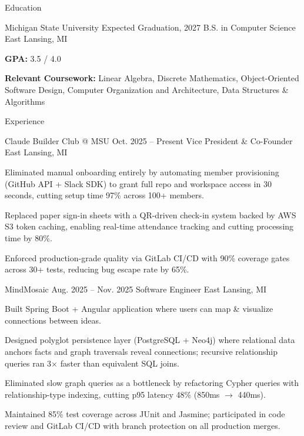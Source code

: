 \documentclass[
	11pt
]{../../../resume}
\begin{document}
	\begin{rSection}{E}{ducation}
		\begin{rSectionEntry}
			{Michigan State University}
			{Expected Graduation, 2027}
			{B.S. in Computer Science}
			{}
			{East Lansing, MI}

			\item \textbf{GPA:} 3.5 / 4.0
			\item \textbf{Relevant Coursework:} Linear Algebra, Discrete Mathematics, Object-Oriented Software Design, Computer Organization and Architecture, Data Structures \& Algorithms
		\end{rSectionEntry}
	\end{rSection}

	\begin{rSection}{E}{xperience}
		\begin{rSectionEntry}
			{Claude Builder Club @ MSU}
			{Oct. 2025 -- Present}
			{Vice President \& Co-Founder}
			{}
			{East Lansing, MI}

			\item Eliminated manual onboarding entirely by automating member provisioning (GitHub API + Slack SDK) to grant full repo and workspace access in 30 seconds, cutting setup time 97\% across 100+ members.
			\item Replaced paper sign-in sheets with a QR-driven check-in system backed by AWS S3 token caching, enabling real-time attendance tracking and cutting processing time by 80\%.
			\item Enforced production-grade quality via GitLab CI/CD with 90\% coverage gates across 30+ tests, reducing bug escape rate by 65\%.
		\end{rSectionEntry}

		\begin{rSectionEntry}
			{MindMosaic}
			{Aug. 2025 -- Nov. 2025}
			{Software Engineer}
			{}
			{East Lansing, MI}

			\item Built Spring Boot + Angular application where users can map \& visualize connections between ideas.
			\item Designed polyglot persistence layer (PostgreSQL + Neo4j) where relational data anchors facts and graph traversals reveal connections; recursive relationship queries ran 3$\times$ faster than equivalent SQL joins.
			\item Eliminated slow graph queries as a bottleneck by refactoring Cypher queries with relationship-type indexing, cutting p95 latency 48\% (850ms $\rightarrow$ 440ms).
			\item Maintained 85\% test coverage across JUnit and Jasmine; participated in code review and GitLab CI/CD with branch protection on all production merges.
		\end{rSectionEntry}
	\end{rSection}
\end{document}
